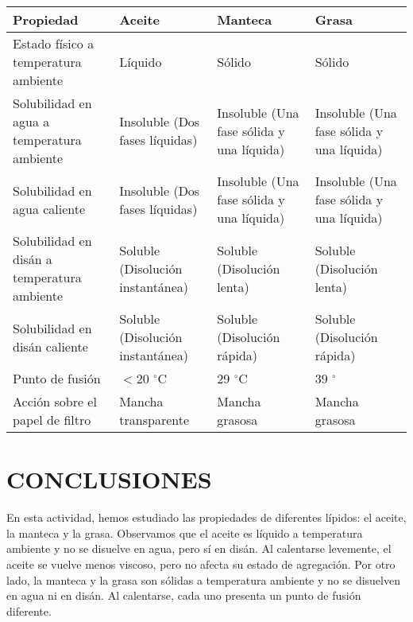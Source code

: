 \documentclass{article}
\begin{document}
\begin{table}[H]
    \begin{tabular}{|p{}|p|p|p|}
    \hline
    Propiedad                                   & Aceite                           & Manteca                                   & Grasa                                     \\ \hline
    \raggedright Estado físico a temperatura ambiente        & Líquido                          & Sólido                                    & Sólido                                    \\ \hline
    \raggedright Solubilidad en agua a temperatura ambiente  & Insoluble (Dos fases líquidas)   & Insoluble (Una fase sólida y una líquida) & Insoluble (Una fase sólida y una líquida) \\ \hline
    \raggedright Solubilidad en agua caliente                & Insoluble (Dos fases líquidas)   & Insoluble (Una fase sólida y una líquida) & Insoluble (Una fase sólida y una líquida) \\ \hline
    \raggedright Solubilidad en disán a temperatura ambiente & Soluble (Disolución instantánea) & Soluble (Disolución lenta)                & Soluble (Disolución lenta)                \\ \hline
    \raggedright Solubilidad en disán caliente               & Soluble (Disolución instantánea) & Soluble (Disolución rápida)               & Soluble (Disolución rápida)               \\ \hline
    \raggedright Punto de fusión                             & $< 20$ $^{\circ}$C               & 29 $^{\circ}$C                            & 39 $^{\circ}$                             \\ \hline
    \raggedright Acción sobre el papel de filtro             & Mancha transparente              & Mancha grasosa                            & Mancha grasosa                            \\ \hline
    \end{tabular}
\end{table}

\section{CONCLUSIONES}
En esta actividad, hemos estudiado las propiedades de diferentes lípidos: el aceite, la manteca y la grasa. Observamos que el aceite es líquido a temperatura ambiente y no se disuelve en agua, pero sí en disán. Al calentarse levemente, el aceite se vuelve menos viscoso, pero no afecta su estado de agregación. Por otro lado, la manteca y la grasa son sólidas a temperatura ambiente y no se disuelven en agua ni en disán. Al calentarse, cada uno presenta un punto de fusión diferente.
\end{document}
